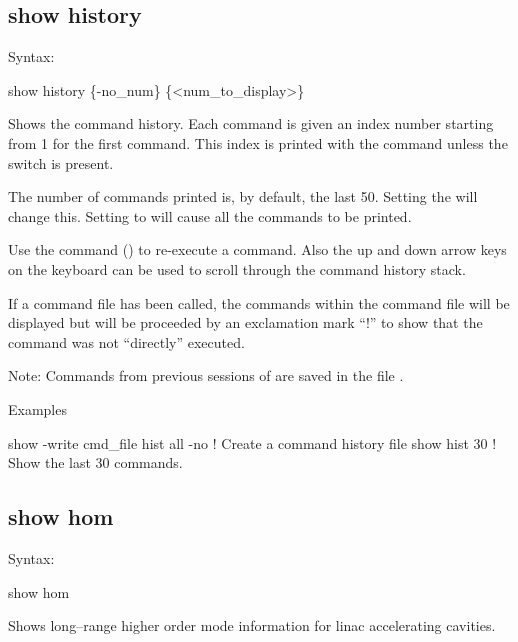 {{{{{{{{%

\subsection{show history}
\label{s:show.history}

Syntax:
\begin{example}
  show history \{-no_num\} \{<num_to_display>\}
\end{example}

Shows the command history. Each command is given an index number starting from 1 for the first
command. This index is printed with the command unless the  switch is present.

The number of commands printed is, by default, the last 50. Setting the  will
change this. Setting  to   will cause all the commands to be printed.

Use the command  () to re-execute a command. Also the up and down
arrow keys on the keyboard can be used to scroll through the command history stack.

If a command file has been called, the commands within the command file will be displayed but will
be proceeded by an exclamation mark ``!'' to show that the command was not ``directly'' executed.

Note: Commands from previous sessions of \tao are saved in the file .

Examples
\begin{example}
  show -write cmd_file hist all -no   ! Create a command history file
  show hist 30                        ! Show the last 30 commands.
\end{example}


\subsection{show hom}
\label{s:show.hom}

Syntax:
\begin{example}
  show hom
\end{example}

Shows long--range higher order mode information for linac accelerating
cavities.


}}}}}}}}
